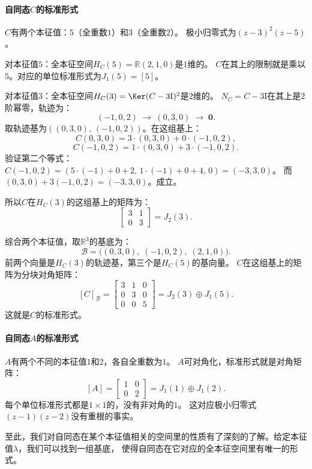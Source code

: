\documentclass[12pt,UTF8,fontset=none]{ctexbook}
\begin{document}
\paragraph{自同态$C$的标准形式}

$C$有两个本征值：$5$（全重数$1$）和$3$（全重数$2$）。
极小归零式为$(z-3)^2(z-5)$。

对本征值$5$：全本征空间$H_C(5) = \mathbb{R}(2,1,0)$是$1$维的。
$C$在其上的限制就是乘以$5$。对应的单位标准形式为$J_1(5) = [5]$。

对本征值$3$：全本征空间$H_C(3) = \Ker(C-3\mathrm{I})^2$是$2$维的。
$N_C = C - 3\mathrm{I}$在其上是$2$阶幂零，轨迹为：
$$
(-1,0,2) \;\longrightarrow\; (0,3,0) \;\longrightarrow\; \mathbf{0}.
$$
取轨迹基为$((0,3,0),\, (-1,0,2))$。在这组基上：
$$
C(0,3,0) = 3\cdot(0,3,0) + 0\cdot(-1,0,2),
$$
$$
C(-1,0,2) = 1\cdot(0,3,0) + 3\cdot(-1,0,2).
$$
验证第二个等式：$C(-1,0,2) = (5\cdot(-1)+0+2,\, 1\cdot(-1)+0+4,\, 0) = (-3, 3, 0)$。
而$(0,3,0) + 3(-1,0,2) = (-3, 3, 0)$。成立。

所以$C$在$H_C(3)$的这组基上的矩阵为：
$$
\begin{bmatrix} 3 & 1 \\ 0 & 3 \end{bmatrix} = J_2(3).
$$

综合两个本征值，取$\mathbb{R}^3$的基底为：
$$
\mathcal{B} = \big((0,3,0),\; (-1,0,2),\; (2,1,0)\big).
$$
前两个向量是$H_C(3)$的轨迹基，第三个是$H_C(5)$的基向量。
$C$在这组基上的矩阵为分块对角矩阵：
$$
[C]_{\mathcal{B}} = \begin{bmatrix} 3 & 1 & 0 \\ 0 & 3 & 0 \\ 0 & 0 & 5 \end{bmatrix} = J_2(3) \oplus J_1(5).
$$
这就是$C$的标准形式。

\paragraph{自同态$A$的标准形式}

$A$有两个不同的本征值$1$和$2$，各自全重数为$1$。
$A$可对角化，标准形式就是对角矩阵：
$$
[A] = \begin{bmatrix} 1 & 0 \\ 0 & 2 \end{bmatrix} = J_1(1) \oplus J_1(2).
$$
每个单位标准形式都是$1\times 1$的，没有非对角的$1$。
这对应极小归零式$(z-1)(z-2)$没有重根的事实。

至此，我们对自同态在某个本征值相关的空间里的性质有了深刻的了解。给定本征值$\lambda$，我们可以找到一组基底，
使得自同态在它对应的全本征空间里有唯一的形式。
\end{document}
